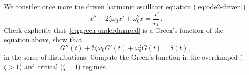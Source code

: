 \begin{ExerciseList}
  \Exercise[label=green] We consider once more the driven harmonic oscillator equation
  (\cf\cref{eq:ode2-driven})
  \begin{equation}
    x''+2\zeta\omega_0x'+\omega_0^2x=\frac{F}{m}\,.
  \end{equation}
  \Question Check explicitly that~\cref{eq:green-underdamped} is a Green's function of the
  equation above, \ie show that
  \begin{equation}
    G''(t)+2\zeta\omega_0G'(t)+\omega_0^2G(t)=\delta(t)\,,
  \end{equation}
  in the sense of distributions.
  \Question Compute the Green's function in the overdamped ($\zeta>1$) and critical
  ($\zeta=1$) regimes.
  \pagebreak
\end{ExerciseList}
